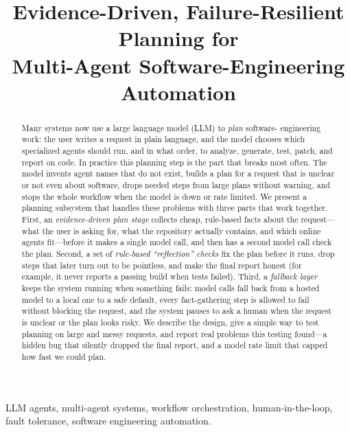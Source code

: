 \documentclass[conference]{IEEEtran}
\begin{document}
\title{Evidence-Driven, Failure-Resilient Planning for\\
Multi-Agent Software-Engineering Automation}

\author{
}

\maketitle

\begin{abstract}
Many systems now use a large language model (LLM) to \emph{plan} software-
engineering work: the user writes a request in plain language, and the model
chooses which specialized agents should run, and in what order, to analyze,
generate, test, patch, and report on code. In practice this planning step is the
part that breaks most often. The model invents agent names that do not exist,
builds a plan for a request that is unclear or not even about software, drops
needed steps from large plans without warning, and stops the whole workflow when
the model is down or rate limited. We present a planning subsystem that handles
these problems with three parts that work together. First, an
\emph{evidence-driven plan stage} collects cheap, rule-based facts about the
request---what the user is asking for, what the repository actually contains, and
which online agents fit---before it makes a single model call, and then has a
second model call check the plan. Second, a set of \emph{rule-based ``reflection''
checks} fix the plan before it runs, drop steps that later turn out to be
pointless, and make the final report honest (for example, it never reports a
passing build when tests failed). Third, a \emph{fallback layer} keeps the system
running when something fails: model calls fall back from a hosted model to a local
one to a safe default, every fact-gathering step is allowed to fail without
blocking the request, and the system pauses to ask a human when the request is
unclear or the plan looks risky. We describe the design, give a simple way to test
planning on large and messy requests, and report real problems this testing
found---a hidden bug that silently dropped the final report, and a model rate limit
that capped how fast we could plan.
\end{abstract}

\begin{IEEEkeywords}
LLM agents, multi-agent systems, workflow orchestration, human-in-the-loop, fault
tolerance, software engineering automation.
\end{IEEEkeywords}
\end{document}
